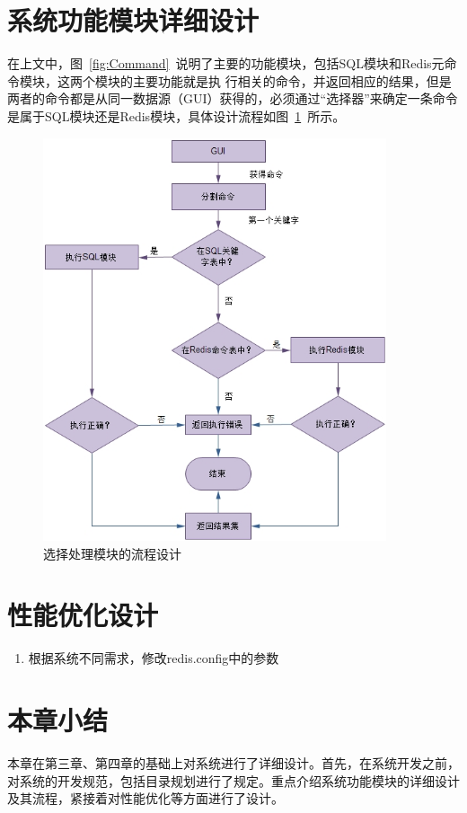 \documentclass{zjutthesis}
\begin{document}
\section{系统功能模块详细设计}
在上文中，图~\ref{fig:Command}~说明了主要的功能模块，包括SQL模块和Redis元命令模块，这两个模块的主要功能就是执
行相关的命令，并返回相应的结果，但是两者的命令都是从同一数据源（GUI）获得的，必须通过“选择器”来确定一条命令是属于SQL模块还是Redis模块，具体设计流程如图~\ref{fig:Selector}~所示。
\begin{figure}[H]
\centering
\includegraphics[width=0.9\textwidth]{Selector}
\caption{选择处理模块的流程设计}\label{fig:Selector}
\vspace{\baselineskip} %
\end{figure}

\section{性能优化设计}
\begin{enumerate}[label=（\arabic*）]
\item{根据系统不同需求，修改redis.config中的参数}
\end{enumerate}

\section{本章小结}
本章在第三章、第四章的基础上对系统进行了详细设计。首先，在系统开发之前，对系统的开发规范，包括目录规划进行了规定。重点介绍系统功能模块的详细设计及其流程，紧接着对性能优化等方面进行了设计。
\end{document}
